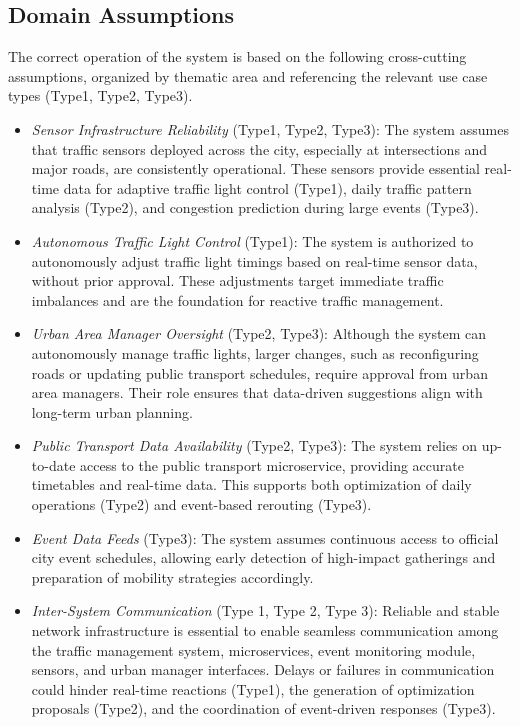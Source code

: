 \documentclass[a4paper,12pt]{article}
\begin{document}
\newpage

\subsection{Domain Assumptions}

The correct operation of the system is based on the following cross-cutting assumptions, organized by thematic area and referencing the relevant use case types (Type1, Type2, Type3).

\begin{itemize}

    \item \textit{Sensor Infrastructure Reliability} (Type1, Type2, Type3): The system assumes that traffic sensors deployed across the city, especially at intersections and major roads, are consistently operational. These sensors provide essential real-time data for adaptive traffic light control (Type1), daily traffic pattern analysis (Type2), and congestion prediction during large events (Type3).

    \item \textit{Autonomous Traffic Light Control} (Type1): The system is authorized to autonomously adjust traffic light timings based on real-time sensor data, without prior approval. These adjustments target immediate traffic imbalances and are the foundation for reactive traffic management.

    \item \textit{Urban Area Manager Oversight} (Type2, Type3): Although the system can autonomously manage traffic lights, larger changes, such as reconfiguring roads or updating public transport schedules, require approval from urban area managers. Their role ensures that data-driven suggestions align with long-term urban planning.

    \item \textit{Public Transport Data Availability} (Type2, Type3): The system relies on up-to-date access to the public transport microservice, providing accurate timetables and real-time data. This supports both optimization of daily operations (Type2) and event-based rerouting (Type3).

    \item \textit{Event Data Feeds} (Type3): The system assumes continuous access to official city event schedules, allowing early detection of high-impact gatherings and preparation of mobility strategies accordingly.

    \item \textit{Inter-System Communication} (Type 1, Type 2, Type 3): Reliable and stable network infrastructure is essential to enable seamless communication among the traffic management system, microservices, event monitoring module, sensors, and urban manager interfaces. Delays or failures in communication could hinder real-time reactions (Type1), the generation of optimization proposals (Type2), and the coordination of event-driven responses (Type3).


\end{itemize}
\end{document}
